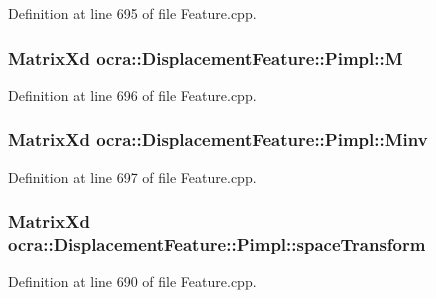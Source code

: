 Definition at line 695 of file Feature.\+cpp.

\subsubsection[{\texorpdfstring{M}{M}}]{\setlength{\rightskip}{0pt plus 5cm}Matrix\+Xd ocra\+::\+Displacement\+Feature\+::\+Pimpl\+::M}\hypertarget{structocra_1_1DisplacementFeature_1_1Pimpl_ac656f6c1eb52377b1d313820f4a448d4}{}\label{structocra_1_1DisplacementFeature_1_1Pimpl_ac656f6c1eb52377b1d313820f4a448d4}


Definition at line 696 of file Feature.\+cpp.

\subsubsection[{\texorpdfstring{Minv}{Minv}}]{\setlength{\rightskip}{0pt plus 5cm}Matrix\+Xd ocra\+::\+Displacement\+Feature\+::\+Pimpl\+::\+Minv}\hypertarget{structocra_1_1DisplacementFeature_1_1Pimpl_a9fc763f2f433156e2df5a239a64e5514}{}\label{structocra_1_1DisplacementFeature_1_1Pimpl_a9fc763f2f433156e2df5a239a64e5514}


Definition at line 697 of file Feature.\+cpp.

\subsubsection[{\texorpdfstring{space\+Transform}{spaceTransform}}]{\setlength{\rightskip}{0pt plus 5cm}Matrix\+Xd ocra\+::\+Displacement\+Feature\+::\+Pimpl\+::space\+Transform}\hypertarget{structocra_1_1DisplacementFeature_1_1Pimpl_ae4f3165c1ca46e3d14cb9fdeab2297a0}{}\label{structocra_1_1DisplacementFeature_1_1Pimpl_ae4f3165c1ca46e3d14cb9fdeab2297a0}


Definition at line 690 of file Feature.\+cpp.

